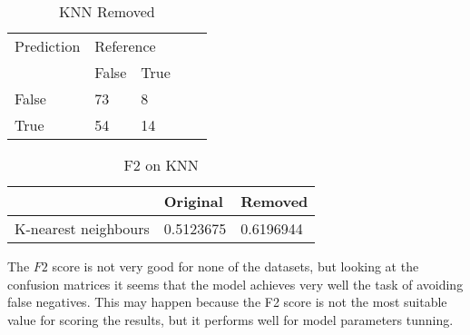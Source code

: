 \begin{table}[!htbp]
\centering
\caption{KNN Removed}
\vspace{0.1cm}
\label{knn-remov}
\begin{tabular}{|l|ll|ll}
\cline{1-3}
Prediction & \multicolumn{2}{l|}{Reference} &  &  \\
           & False          & True          &  &  \\ \cline{2-3}
False      & 73              & 8             &  &  \\
True       & 54              & 14             &  &  \\ \cline{1-3}
\end{tabular}
\end{table}

\begin{table}[!htbp]
\centering
\caption{F2 on KNN}
\vspace{0.1cm}
\label{knn-f2}
\begin{tabular}{|l|l|l|}
\hline
      & Original & Removed \\ \hline
K-nearest neighbours & 0.5123675 & 0.6196944          \\ \hline
\end{tabular}
\end{table}



The $F2$ score is not very good for none of the datasets, but looking at the confusion matrices it seems that the model achieves very well the task of avoiding false negatives. This may happen because the F2 score is not the most suitable value for scoring the results, but it performs well for model parameters tunning.




